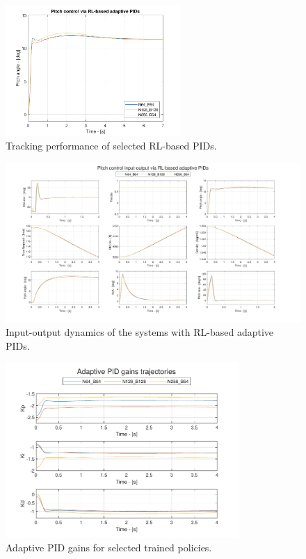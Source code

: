 \documentclass[lettersize,journal]{IEEEtran}
\begin{document}
\begin{figure}[!t]
\centering
\includegraphics[width=2.6in]{figs/tracking_performance_rl_adaptive_pids.pdf}
\caption{Tracking performance of selected RL-based PIDs.}
\label{fig:tracking_performance_rl_adaptive_pids}
\end{figure}

\begin{figure}[!t]
\centering
\includegraphics[width=7in]{figs/input_output_rl_pids.pdf}%
\caption{Input-output dynamics of the systems with RL-based adaptive PIDs.}
\label{fig:io_rl_pids}
\end{figure}

\begin{figure}[!t]
\centering
\includegraphics[width=3.5in]{figs/adaptive_pid_gains.pdf}
\caption{Adaptive PID gains for selected trained policies.}
\label{fig:adaptive_pid_gains}
\end{figure}
\end{document}
